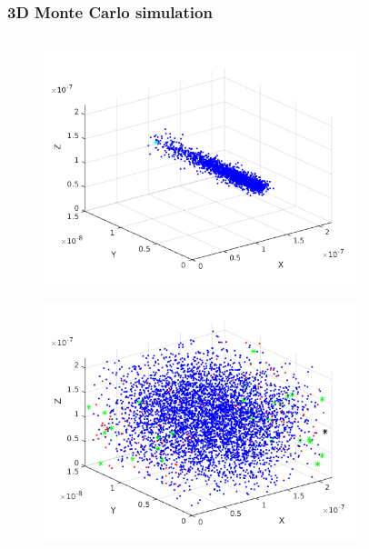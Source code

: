 \documentclass[screen]{beamer}
\begin{document}
\begin{frame}
	\frametitle{3D Monte Carlo simulation}
\begin{columns}
    \begin{column}{.5\linewidth}
        \begin{figure}
  		\includegraphics[scale=0.25]{sim01}
  		\end{figure}
  		\begin{figure}
  		\includegraphics[scale=0.25]{sim03}
  		\end{figure}
    \end{column}
    \begin{column}{.5\linewidth}
        \begin{figure}

\end{figure}
\end{column}
\end{columns}
\end{frame}
\end{document}
